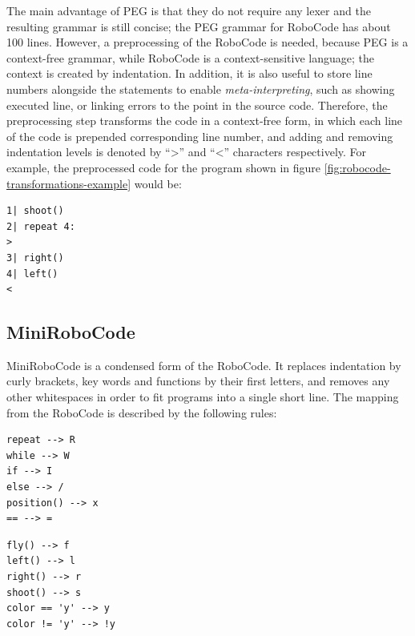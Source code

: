 The main advantage of PEG is that they do not require any lexer %
and the resulting grammar is still concise; %
the PEG grammar for RoboCode %
has about 100 lines. %
However, a preprocessing of the RoboCode is needed, because
PEG is a context-free grammar,
while RoboCode is a context-sensitive language;
the context is created by indentation.
In addition, it is also useful to store line numbers alongside the statements
to enable \emph{meta-interpreting},
such as showing executed line, or linking errors to the point in the source code.
Therefore, the preprocessing step transforms the code in a context-free form,
in which each line of the code is prepended corresponding line number,
and adding and removing indentation levels is denoted by ``>'' and ``<'' characters respectively.
For example, the preprocessed code for the program shown in figure
\ref{fig:robocode-transformations-example} would be:
\begin{lstlisting}
1| shoot()
2| repeat 4:
>
3| right()
4| left()
<
\end{lstlisting}

\subsection{MiniRoboCode}

MiniRoboCode is a condensed form of the RoboCode.
It replaces indentation by curly brackets,
key words and functions by their first letters,
and removes any other whitespaces
in order to fit programs into a single short line.
The mapping from the RoboCode is described by the following rules:
\smallskip

\noindent\begin{minipage}{.49\textwidth}
\begin{lstlisting}[numbers=none]
repeat --> R
while --> W
if --> I
else --> /
position() --> x
== --> =
\end{lstlisting}
\end{minipage}\hfill
\begin{minipage}{.49\textwidth}
\begin{lstlisting}[numbers=none]
fly() --> f
left() --> l
right() --> r
shoot() --> s
color == 'y' --> y
color != 'y' --> !y
\end{lstlisting}
\end{minipage}

